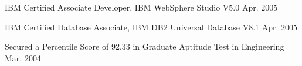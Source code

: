 

\begin{cventries}

  \certentry
    {IBM Certified Associate Developer, IBM WebSphere Studio V5.0} %
    {Apr. 2005} %

  \certentry
    {IBM Certified Database Associate, IBM DB2 Universal Database V8.1} %
    {Apr. 2005} %

  \certentry
    {Secured a Percentile Score of 92.33 in Graduate Aptitude Test in Engineering} %
    {Mar. 2004} %

\end{cventries}
